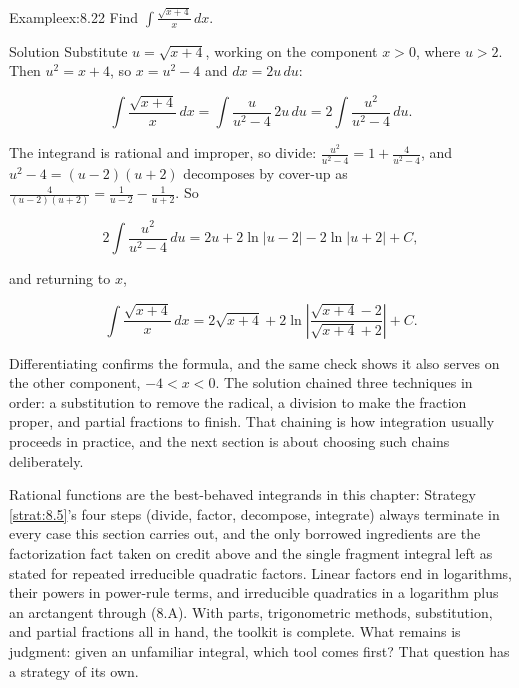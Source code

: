 \documentclass[a4paper,12pt,oneside]{memoir}
\begin{document}
\begin{workedexample}
\begin{envexample}{Example}{ex:8.22}{}
Find \(\displaystyle\int \frac{\sqrt{x + 4}}{x}\,dx\).
\end{envexample}
\begin{envsolution}{Solution}{}{}
Substitute \(u = \sqrt{x + 4}\), working on the component \(x > 0\), where \(u > 2\). Then \(u^{2} = x + 4\), so \(x = u^{2} - 4\) and \(dx = 2u\,du\):

\[ \int \frac{\sqrt{x + 4}}{x}\,dx = \int \frac{u}{u^{2} - 4}\,2u\,du = 2\int \frac{u^{2}}{u^{2} - 4}\,du. \]

The integrand is rational and improper, so divide: \(\frac{u^{2}}{u^{2} - 4} = 1 + \frac{4}{u^{2} - 4}\), and \(u^{2} - 4 = (u - 2)(u + 2)\) decomposes by cover-up as \(\frac{4}{(u-2)(u+2)} = \frac{1}{u - 2} - \frac{1}{u + 2}\). So

\[ 2\int \frac{u^{2}}{u^{2} - 4}\,du = 2u + 2\ln\lvert u - 2\rvert - 2\ln\lvert u + 2\rvert + C, \]

and returning to \(x\),

\[ \int \frac{\sqrt{x + 4}}{x}\,dx = 2\sqrt{x + 4} + 2\ln\left\lvert \frac{\sqrt{x + 4} - 2}{\sqrt{x + 4} + 2} \right\rvert + C. \]

Differentiating confirms the formula, and the same check shows it also serves on the other component, \(-4 < x < 0\). The solution chained three techniques in order: a substitution to remove the radical, a division to make the fraction proper, and partial fractions to finish. That chaining is how integration usually proceeds in practice, and the next section is about choosing such chains deliberately. \qedmark
\end{envsolution}
\end{workedexample}
Rational functions are the best-behaved integrands in this chapter: Strategy \ref{strat:8.5}’s four steps (divide, factor, decompose, integrate) always terminate in every case this section carries out, and the only borrowed ingredients are the factorization fact taken on credit above and the single fragment integral left as stated for repeated irreducible quadratic factors. Linear factors end in logarithms, their powers in power-rule terms, and irreducible quadratics in a logarithm plus an arctangent through (8.A). With parts, trigonometric methods, substitution, and partial fractions all in hand, the toolkit is complete. What remains is judgment: given an unfamiliar integral, which tool comes first? That question has a strategy of its own.
\end{document}
